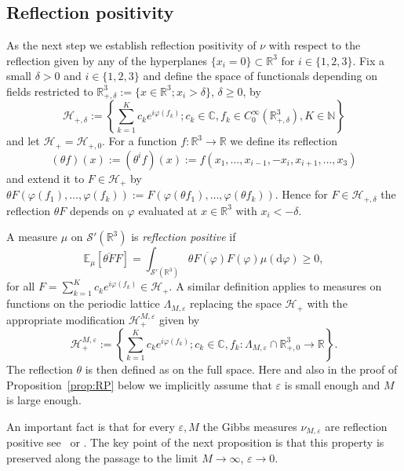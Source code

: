 \documentclass[a4paper,11pt]{article}
\newcommand{\assign}{:=}
\newcommand{\mathd}{\mathrm{d}}
\numberwithin{equation}{section}
\begin{document}
\subsection{Reflection positivity}
\label{ss:OS2}

As the next step we
establish reflection positivity of
$\nu$ with respect to the reflection given by any of the hyperplanes $\{x_i=0\}\subset \mathbb{R}^3$ for $i \in \{1, 2,3\}$. 
Fix a small $\delta>0$  and $i\in\{1,2,3\}$ and  define
the space of functionals depending on fields restricted to
$\mathbb{R}^3_{+, \delta}  := \{x \in \mathbb{R}^3 ; x_i > \delta\}$, $\delta\geqslant0$, by
\[ \mathcal{H}_{+, \delta} \assign \left\{ \sum_{k = 1}^K c_k e^{i \varphi
   (f_k)} ; c_k \in \mathbb{C}, f_k \in C^{\infty}_0 (\mathbb{R}^3_{+,\delta}), K \in
   \mathbb{N} \right\} \]
and let $\mathcal{H}_+ =\mathcal{H}_{+, 0}$. For a function $f : \mathbb{R}^3
\rightarrow \mathbb{R}$ we define its reflection
\[ (\theta f) (x) \assign (\theta^i f) (x) \assign f (x_1, \ldots, x_{i - 1},
   - x_i, x_{i + 1}, \ldots, x_3) \]
and extend it to $F \in \mathcal{H}_+$ by $\theta F (\varphi (f_1), \ldots,
\varphi (f_k)) \assign F (\varphi (\theta f_1), \ldots, \varphi (\theta
f_k))$. Hence for $F \in \mathcal{H}_{+, \delta}$ the reflection $\theta F$
depends on $\varphi$ evaluated at $x \in \mathbb{R}^3$ with $x_i < - \delta$.

A measure $\mu$ on $\mathcal{S}'(\mathbb{R}^3)$ is \emph{reflection positive} if
\[ \mathbb{E}_{\mu}  [\overline{\theta F} F] = \int_{\mathcal{S}'
   (\mathbb{R}^3)} \overline{\theta F (\varphi)} F (\varphi) \mu (\mathd
   \varphi) 
   \geqslant 0, \]
for all $F = \sum_{k = 1}^K c_k e^{i \varphi (f_k)} \in \mathcal{H}_+$.
A similar definition applies to measures on functions on the periodic lattice ${\Lambda_{M, \varepsilon}}$ replacing the space $\mathcal{H}_+$ with the appropriate modification $\mathcal{H}_+^{M, \varepsilon}$ given by
$$
\mathcal{H}^{M,\varepsilon}_{+} \assign \left\{ \sum_{k = 1}^K c_k e^{i \varphi
   (f_k)} ; c_k \in \mathbb{C}, f_k :\Lambda_{M,\varepsilon}\cap\mathbb{R}^{3}_{+,0}\to\mathbb{R}\right\}.
$$
The reflection $\theta$ is then defined as on the full space.
Here and also in the proof of Proposition~\ref{prop:RP} below we implicitly assume that $\varepsilon$ is small enough and $M$ is large enough.

An important fact is that for every  $\varepsilon, M$ the Gibbs  measures $\nu_{M, \varepsilon}$ are reflection
  positive see~{\cite[Theorem 7.10.3]{MR887102} or  \cite[Lemma 10.8]{friedli2017statistical}}. The key point of the next proposition is that this property is preserved along the passage to the limit $M\to\infty$, $\varepsilon\to0$.
\end{document}
